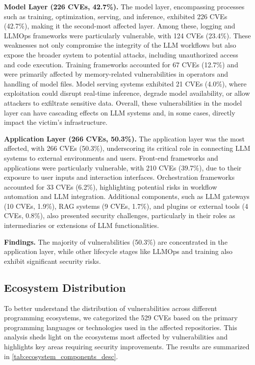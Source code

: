 \noindent \textbf{Model Layer (226 CVEs, 42.7\%).} The model layer, encompassing processes such as training, optimization, serving, and inference, exhibited 226 CVEs (42.7\%), making it the second-most affected layer. Among these, logging and LLMOps frameworks were particularly vulnerable, with 124 CVEs (23.4\%). These weaknesses not only compromise the integrity of the LLM workflows but also expose the broader system to potential attacks, including unauthorized access and code execution. Training frameworks accounted for 67 CVEs (12.7\%) and were primarily affected by memory-related vulnerabilities in operators and handling of model files. Model serving systems exhibited 21 CVEs (4.0\%), where exploitation could disrupt real-time inference, degrade model availability, or allow attackers to exfiltrate sensitive data. Overall, these vulnerabilities in the model layer can have cascading effects on LLM systems and, in some cases, directly impact the victim’s infrastructure.

\noindent \textbf{Application Layer (266 CVEs, 50.3\%).} The application layer was the most affected, with 266 CVEs (50.3\%), underscoring its critical role in connecting LLM systems to external environments and users. Front-end frameworks and applications were particularly vulnerable, with 210 CVEs (39.7\%), due to their exposure to user inputs and interaction interfaces. Orchestration frameworks accounted for 33 CVEs (6.2\%), highlighting potential risks in workflow automation and LLM integration. Additional components, such as LLM gateways (10 CVEs, 1.9\%), RAG systems (9 CVEs, 1.7\%), and plugins or external tools (4 CVEs, 0.8\%), also presented security challenges, particularly in their roles as intermediaries or extensions of LLM functionalities.

\begin{tcolorbox}
    \textbf{Findings.} The majority of vulnerabilities (50.3\%) are concentrated in the application layer, while other lifecycle stages like LLMOps and training also exhibit significant security risks.
\end{tcolorbox}

\subsection{Ecosystem Distribution}
To better understand the distribution of vulnerabilities across different programming ecosystems, we categorized the 529 CVEs based on the primary programming languages or technologies used in the affected repositories. This analysis sheds light on the ecosystems most affected by vulnerabilities and highlights key areas requiring security improvements. The results are summarized in \autoref{tab:ecosystem_components_desc}.

